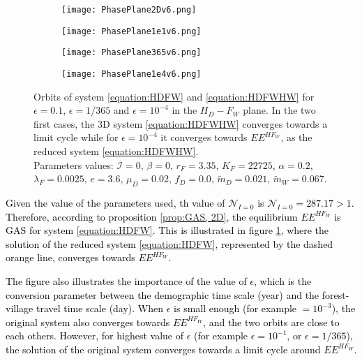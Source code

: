 \documentclass{article}
\newcommand{\lfw}{\lambda_{F}}
\newcommand{\lfw}{\lambda_{F}}
\newcommand{\cI}{\mathcal{I}}
\newcommand{\mW}{\tilde{m}_W}
\newcommand{\mD}{\tilde{m}_D}
\newcommand{\vdeux}[1]{\textcolor{black}{#1}}
\theoremstyle{definition}
\theoremstyle{remark}
\begin{document}
\vspace{0.1cm}
\begin{figure}[!h]
\centering
\begin{subfigure}{0.45\textwidth}
\centering
\texttt{[image: PhasePlane2Dv6.png]}
\caption{}
\end{subfigure}
\begin{subfigure}{0.45\textwidth}
\centering
\texttt{[image: PhasePlane1e1v6.png]}
\caption{}
\end{subfigure}
\begin{subfigure}{0.45\textwidth}
\centering
\texttt{[image: PhasePlane365v6.png]}
\caption{}
\end{subfigure}
\begin{subfigure}{0.45\textwidth}
\centering
\texttt{[image: PhasePlane1e4v6.png]}
\caption{}
\end{subfigure}
\caption{Orbits of system \eqref{equation:HDFW} and \eqref{equation:HDFWHW} for $\epsilon = 0.1$, $\epsilon = 1/365$ and $\epsilon = 10^{-4}$ in the $H_D - F_W$ plane. In the two first cases, the 3D system \eqref{equation:HDFWHW} converges towards a limit cycle while for $\epsilon = 10^{-4}$ it converges towards $EE^{HF_W}$, as the reduced system \eqref{equation:HDFWHW}. \\
Parameters values: $\cI = 0$, $\beta = 0$, $r_F = 3.35$, $K_F = 22725$, $\alpha = 0.2$, $\lfw = 0.0025$, $e = 3.6$, $\mu_D = 0.02$, $f_D = 0.0$, $\mD = 0.021$, $\mW = 0.067$.}
\label{fig:comparison 2D-3D}
\end{figure}


\vdeux{
Given the value of the parameters used, th value of $\mathcal{N}_{I=0}$ is $\mathcal{N}_{I=0}=287.17 > 1$. Therefore, according to proposition \ref{prop:GAS, 2D}, the equilibrium $EE^{HF_W}$ is GAS for system \eqref{equation:HDFW}. This is illustrated in figure \ref{fig:comparison 2D-3D}, where the solution of the reduced system \eqref{equation:HDFW}, represented by the dashed orange line, converges towards $EE^{HF_W}$.}

\vdeux{
The figure also illustrates the importance of the value of $\epsilon$, which is the conversion parameter between the demographic time scale (year) and the forest-village travel time scale (day). When $\epsilon$ is small enough (for example $= 10^{-3}$), the original system also converges towards $EE^{HF_W}$, and the two orbits are close to each others.
However, for highest value of $\epsilon$ (for example $\epsilon = 10^{-1}$, or $\epsilon = 1/365 $), the solution of the original system converges towards a limit cycle around $EE^{HF_W}$.
}
\end{document}

